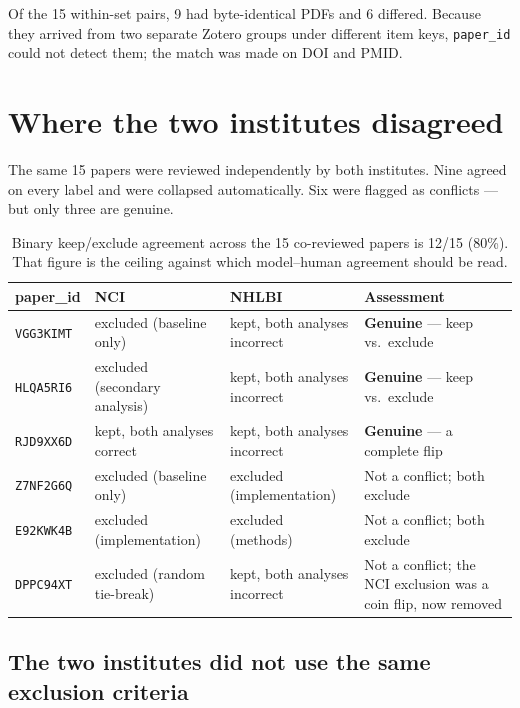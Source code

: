 \documentclass[11pt]{article}
\begin{document}
Of the 15 within-set pairs, 9 had byte-identical PDFs and 6 differed. Because they arrived from two
separate Zotero groups under different item keys, \texttt{paper\_id} could not detect them; the match
was made on DOI and PMID.

\section{Where the two institutes disagreed}

The same 15 papers were reviewed independently by both institutes. Nine agreed on every label and were
collapsed automatically. Six were flagged as conflicts --- but only three are genuine.

\begin{table}[h]
\centering
\small
\begin{tabular}{lllp{4.1cm}}
\toprule
\textbf{paper\_id} & \textbf{NCI} & \textbf{NHLBI} & \textbf{Assessment} \\
\midrule
\texttt{VGG3KIMT} & excluded (baseline only) & kept, both analyses incorrect & \textbf{Genuine} --- keep vs.\ exclude \\
\texttt{HLQA5RI6} & excluded (secondary analysis) & kept, both analyses incorrect & \textbf{Genuine} --- keep vs.\ exclude \\
\texttt{RJD9XX6D} & kept, both analyses correct & kept, both analyses incorrect & \textbf{Genuine} --- a complete flip \\
\midrule
\texttt{Z7NF2G6Q} & excluded (baseline only) & excluded (implementation) & Not a conflict; both exclude \\
\texttt{E92KWK4B} & excluded (implementation) & excluded (methods) & Not a conflict; both exclude \\
\texttt{DPPC94XT} & excluded (random tie-break) & kept, both analyses incorrect & Not a conflict; the NCI exclusion was a coin flip, now removed \\
\bottomrule
\end{tabular}
\caption{Binary keep/exclude agreement across the 15 co-reviewed papers is 12/15 (80\%). That figure
is the ceiling against which model--human agreement should be read.}
\end{table}

\subsection*{The two institutes did not use the same exclusion criteria}
\end{document}
